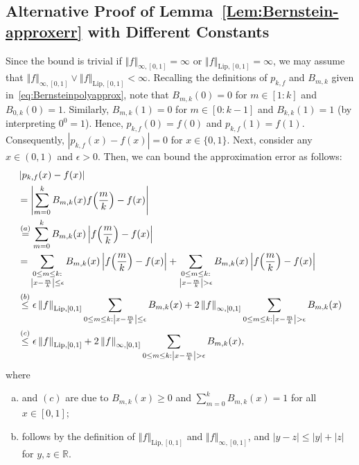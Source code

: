 \documentclass[a4paper,onecolumn,11pt,accepted=2026-05-12]{quantumarticle}
\newcommand{\norm}[1]{\left\Vert#1\right\Vert}
\newcommand{\abs}[1]{\left\vert#1\right\vert}
\newcommand{\RR}{\mathbb{R}}
\begin{document}
\subsection*{Alternative Proof of Lemma~\ref{Lem:Bernstein-approxerr} with  Different Constants} 
 Since the bound is trivial if $\norm{f}_{\infty,[0,1]}=\infty$ or $\norm{f}_{\mathrm{Lip},[0,1]}=\infty$, we may assume that $\norm{f}_{\infty,[0,1]} \vee \norm{f}_{\mathrm{Lip},[0,1]} <\infty $.
Recalling the definitions of $p_{k,f}$ and $B_{m,k}$ given in~\eqref{eq:Bernsteinpolyapprox},  note that $B_{m,k}(0)=0$ for $m \in [1:k]$ and $B_{0,k}(0)=1$. Similarly, $B_{m,k}(1)=0$ for $m \in [0:k-1]$ and $B_{k,k}(1)=1$ (by interpreting $0^0=1$).  Hence, $p_{k,f}(0)=f(0)$ and $p_{k,f}(1)=f(1)$. Consequently, $\abs{p_{k,f}(x)-f(x)}=0$ for $x \in \{0,1\}$. Next, consider any $x \in (0,1)$  and  $\epsilon>0$.  Then, we can bound the approximation error   as follows:
\begin{align}
  &  \abs{p_{k,f}(x)-f(x)} \notag \\
  &=  \abs{ \sum_{m=0}^k B_{m,k}(x) f\!\left(\frac{m}{k}\right)-f(x)} \notag \\
    & \stackrel{(a)}{=}  \sum_{m=0}^k  B_{m,k}(x) \abs{f\!\left(\frac{m}{k}\right)-f(x)} \notag \\
        & =  \sum_{\substack{0 \leq m \leq k:\\ \abs{x-\frac{m}{k}} \leq \epsilon   }}  B_{m,k}(x) \abs{f\!\left(\frac{m}{k}\right)-f(x)}+\sum_{\substack{0 \leq m \leq k:\\ \abs{x-\frac{m}{k}} > \epsilon   }}  B_{m,k}(x) \abs{f\!\left(\frac{m}{k}\right)-f(x)} \notag \\
        &\stackrel{(b)}{ \leq }   \epsilon \norm{f}_{\mathrm{Lip},[0,1]} \sum_{\substack{0 \leq m \leq k: \abs{x-\frac{m}{k}} \leq \epsilon   }}  B_{m,k}(x) +2 \norm{f}_{\infty,[0,1]} \sum_{\substack{0 \leq m \leq k: \abs{x-\frac{m}{k}} > \epsilon   }}  B_{m,k}(x) \notag \\
        &\stackrel{(c)}{ \leq }  \epsilon \norm{f}_{\mathrm{Lip},[0,1]} +2 \norm{f}_{\infty,[0,1]} \sum_{\substack{0 \leq m \leq k: \abs{x-\frac{m}{k}} > \epsilon   }}  B_{m,k}(x), \label{eq:errboundbern}  
\end{align}
where 
\begin{enumerate}[(a)]
    \item and $(c)$ are due to $B_{m,k}(x)\geq 0$ and $\sum_{m=0}^k  B_{m,k}(x)=1$ for all $x \in [0,1]$;
    \item follows  by the definition of $\norm{f}_{\mathrm{Lip},[0,1]}$ and $\norm{f}_{\infty,[0,1]}$, and $|y-z| \leq |y|+|z|$ for $y,z \in \RR$.
\end{enumerate}
\end{document}
